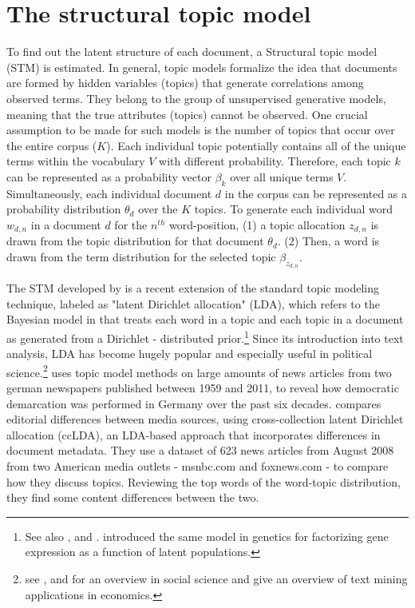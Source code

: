 \documentclass[12pt,a4paper,notitlepage]{article}
\begin{document}
\section{The structural topic model}\label{ch_model}

To find out the latent structure of each document, a Structural topic model (STM) is estimated. In general, topic models formalize the idea that documents are formed by hidden variables (topics) that generate correlations among observed terms. They belong to the group of unsupervised generative models, meaning that the true attributes (topics) cannot be observed. One crucial assumption to be made for such models is the number of topics that occur over the entire corpus ($K$). Each individual topic potentially contains all of the unique terms within the vocabulary $V$ with different probability. Therefore, each topic $k$ can be represented as a probability vector $\beta_k$ over all unique terms $V$. Simultaneously, each individual document $d$ in the corpus can be represented as a probability distribution $\theta_d$ over the $K$ topics. To generate each individual word $w_{d,n}$ in a document $d$ for the $n^{th}$ word-position, (1) a topic allocation $z_{d,n}$ is drawn from the topic distribution for that document $\theta_d$. (2) Then, a word is drawn from the term distribution for the selected topic $\beta_{z_{d,n}}$.

The STM developed by \citet{roberts_model_2016} is a recent extension of the standard topic modeling technique, labeled as "latent Dirichlet allocation" (LDA), which refers to the Bayesian model in \citet{blei_latent_2003} that treats each word in a topic and each topic in a document as generated from a Dirichlet - distributed prior.\footnote{See also \citet{griffiths_probabilistic_2002}, \citet{griffiths_finding_2004} and \citet{hofmann_probabilistic_1999}. \citet{pritchard_inference_2000} introduced the same model in genetics for factorizing gene expression as a function of latent populations.} Since its introduction into text analysis, LDA has become hugely popular and especially useful in political science.\footnote{see \citet{blei_probabilistic_2012}, \citet{grimmer_text_2013} and \citet{wiedmann_text_2016} for an overview in social science and \citet{gentzkow_text_2017} give an overview of text mining applications in economics.} \citet{wiedmann_text_2016} uses topic model methods on large amounts of news articles from two german newspapers published between 1959 and 2011, to reveal how democratic demarcation was performed in Germany over the past six decades. \citet{paul_cross-collection_2017} compares editorial differences between media sources, using cross-collection latent Dirichlet allocation (ccLDA), an LDA-based approach that incorporates differences in document metadata. They use a dataset of 623 news articles from August 2008 from two American media outlets - msnbc.com and foxnews.com - to compare how they discuss topics. Reviewing the top words of the word-topic distribution, they find some content differences between the two. 
\end{document}
